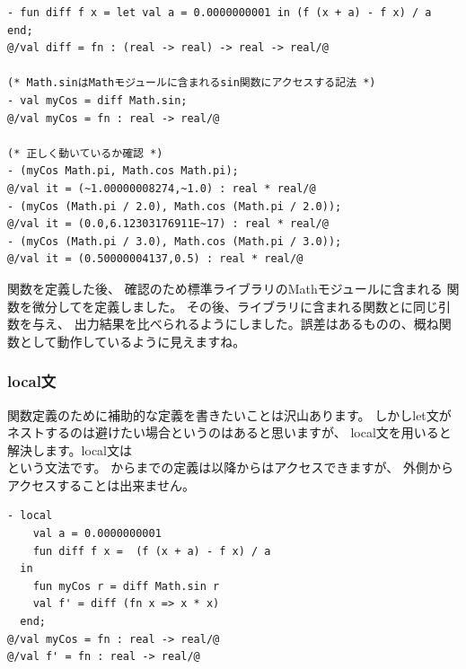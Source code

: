\documentclass[11pt,a4paper]{jarticle}
\begin{document}
\begin{lstlisting}[caption=高階関数の例,label=code:diff]
- fun diff f x = let val a = 0.0000000001 in (f (x + a) - f x) / a end;
@/val diff = fn : (real -> real) -> real -> real/@

(* Math.sinはMathモジュールに含まれるsin関数にアクセスする記法 *)
- val myCos = diff Math.sin;
@/val myCos = fn : real -> real/@

(* 正しく動いているか確認 *)
- (myCos Math.pi, Math.cos Math.pi);
@/val it = (~1.00000008274,~1.0) : real * real/@
- (myCos (Math.pi / 2.0), Math.cos (Math.pi / 2.0));
@/val it = (0.0,6.12303176911E~17) : real * real/@
- (myCos (Math.pi / 3.0), Math.cos (Math.pi / 3.0));
@/val it = (0.50000004137,0.5) : real * real/@
\end{lstlisting}

関数を定義した後、
確認のため標準ライブラリのMathモジュールに含まれる
関数を微分してを定義しました。
その後、ライブラリに含まれる関数とに同じ引数を与え、
出力結果を比べられるようにしました。誤差はあるものの、概ね関数として動作しているように見えますね。

\subsubsection{local文}

関数定義のために補助的な定義を書きたいことは沢山あります。
しかしlet文がネストするのは避けたい場合というのはあると思いますが、
local文を用いると解決します。local文は \\
という文法です。
からまでの定義は以降からはアクセスできますが、
外側からアクセスすることは出来ません。

\begin{lstlisting}[caption=local文]
- local
    val a = 0.0000000001
    fun diff f x =  (f (x + a) - f x) / a
  in
    fun myCos r = diff Math.sin r
    val f' = diff (fn x => x * x)
  end;
@/val myCos = fn : real -> real/@
@/val f' = fn : real -> real/@
\end{lstlisting}

\end{document}
